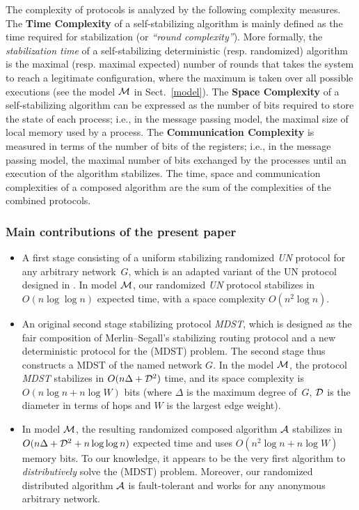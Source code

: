\documentclass[10pt]{article}
\newcommand{\bi}{\begin{itemize}}
\newcommand{\ei}{\end{itemize}}
\begin{document}
The complexity of protocols is analyzed by the following
complexity measures. The {\bf Time Complexity} of a self-stabilizing
algorithm is mainly defined as the time required for stabilization (or {\em
``round complexity''}). More formally, the {\em stabilization time} of a
self-stabilizing deterministic (resp. randomized) algorithm is the
maximal (resp. maximal expected) number of rounds that takes the
system to reach a legitimate configuration, where the maximum is taken
over all possible executions (see the model $\cal M$ in Sect.~\ref{model}). 
The {\bf Space Complexity} of a self-stabilizing algorithm can be
expressed as the number of bits required to store the state of each
process; i.e., in the message passing model, the maximal size of local
memory used by a process. The {\bf Communication Complexity} is
measured in terms of the number of bits of the registers; i.e., in the
message passing model, the maximal number of bits exchanged by the
processes until an execution of the algorithm stabilizes. The time,
space and communication complexities of a composed algorithm are the
sum of the complexities of the combined protocols.

\subsubsection{Main contributions of the present paper}
\bi
\item A first stage consisting of a uniform stabilizing randomized
{\em UN}  protocol for any arbitrary network~$G$, which is an adapted
variant of the UN protocol designed in \cite{AnEH92}. In model $\cal M$,
our randomized {\em UN} protocol stabilizes in $O(n \log\log n)$
expected time, with a space complexity $O(n^2 \log n)$.
\item An original second stage stabilizing protocol {\em MDST}, which is
designed as the fair composition of Merlin--Segall's stabilizing
routing protocol and a new deterministic protocol for the (MDST)
problem. The second stage thus constructs a MDST of the named network
$G$. In the model $\cal M$, the protocol {\em MDST} stabilizes in
$O(n\Delta + {\cal D}^2)$ time, and its space complexity
is $O(n \log n + n \log W)$ bits (where $\Delta$ is the maximum degree
of~$G$, $\cal D$ is the diameter in terms of hops and $W$ is the
largest edge weight).
\item In model $\cal M$, the resulting randomized composed algorithm
$\cal A$ stabilizes in $O(n\Delta + {\cal D}^2+n\log\log n)$ expected
time and uses
$O(n^2 \log n + n \log W)$ memory bits. To our knowledge, it appears
to be the very first algorithm to {\em distributively} solve the (MDST)
problem. Moreover, our randomized distributed algorithm $\cal A$ is
fault-tolerant and works for any anonymous arbitrary network.
\ei
\end{document}
